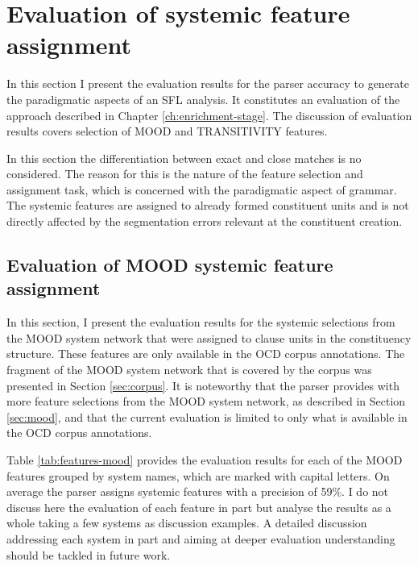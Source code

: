\section{Evaluation of systemic feature assignment}
\label{sec:systemic-evaluation}
    
    In this section I present the evaluation results for the parser accuracy to generate the paradigmatic aspects of an SFL analysis. It constitutes an evaluation of the approach described in Chapter \ref{ch:enrichment-stage}. The discussion of evaluation results covers selection of MOOD and TRANSITIVITY features. %
    
    In this section the differentiation between exact and close matches is no considered. The reason for this is the nature of the feature selection and assignment task, which is concerned with the paradigmatic aspect of grammar. The systemic features are assigned to already formed constituent units and is not directly affected by the segmentation errors relevant at the constituent creation. 
    
\subsection{Evaluation of MOOD systemic feature assignment}
\label{sec:systemic-evaluation-MOOD}

    In this section, I present the evaluation results for the systemic selections from the MOOD system network that were assigned to clause units in the constituency structure. These features are only available in the OCD corpus annotations. The fragment of the MOOD system network that is covered by the corpus was presented in Section \ref{sec:corpus}. It is noteworthy that the parser provides with more feature selections from the MOOD system network, as described in Section \ref{sec:mood}, and that the current evaluation is limited to only what is available in the OCD corpus annotations.

    Table \ref{tab:features-mood} provides the evaluation results for each of the MOOD features grouped by system names, which are marked with capital letters. On average the parser assigns systemic features with a precision of 59\%. I do not discuss here the evaluation of each feature in part but analyse the results as a whole taking a few systems as discussion examples. A detailed discussion addressing each system in part and aiming at deeper evaluation understanding should be tackled in future work.

